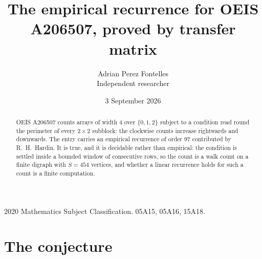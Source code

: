 \documentclass[11pt,a4paper]{article}
\title{The empirical recurrence for OEIS A206507, proved by transfer matrix}
\author{Adrian Perez Fontelles\\ \small Independent researcher}
\date{3 September 2026}
\theoremstyle{plain}
\theoremstyle{definition}
\begin{document}
\maketitle

\begin{abstract}
OEIS A206507 counts arrays of width $4$ over $\{0,1,2\}$ subject to a condition read round the
perimeter of every $2\times2$ subblock: the clockwise counts increase rightwards and downwards. The entry carries an empirical recurrence of
order $97$ contributed by R.~H.~Hardin. It is true, and it is decidable rather than
empirical: the condition is settled inside a bounded window of consecutive rows, so the
count is a walk count on a finite digraph with $S=454$ vertices, and whether a linear
recurrence holds for such a count is a finite computation.
\end{abstract}

\noindent\small 2020 Mathematics Subject Classification. 05A15, 05A16, 15A18.\normalsize

\section{The conjecture}
\end{document}
